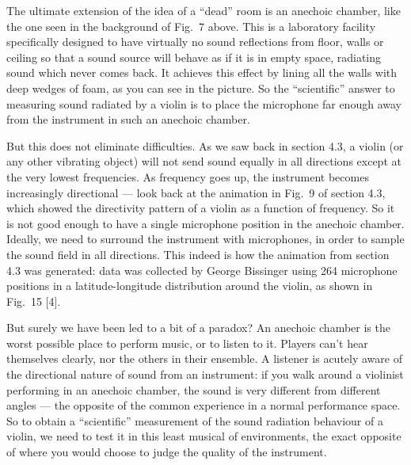   The ultimate extension of the idea of a “dead” room is an anechoic chamber, 
  like the one seen in the background of Fig.\ 7 above. This is a laboratory 
  facility specifically designed to have virtually no sound reflections from 
  floor, walls or ceiling so that a sound source will behave as if it is in 
  empty space, radiating sound which never comes back. It achieves this effect 
  by lining all the walls with deep wedges of foam, as you can see in the 
  picture. So the “scientific” answer to measuring sound radiated by a violin 
  is to place the microphone far enough away from the instrument in such an 
  anechoic chamber. 

  But this does not eliminate difficulties. As we saw back in section 4.3, a 
  violin (or any other vibrating object) will not send sound equally in all 
  directions except at the very lowest frequencies. As frequency goes up, the 
  instrument becomes increasingly directional — look back at the animation in 
  Fig.\ 9 of section 4.3, which showed the directivity pattern of a violin as a 
  function of frequency. So it is not good enough to have a single microphone 
  position in the anechoic chamber. Ideally, we need to surround the instrument 
  with microphones, in order to sample the sound field in all directions. This 
  indeed is how the animation from section 4.3 was generated: data was 
  collected by George Bissinger using 264 microphone positions in a 
  latitude-longitude distribution around the violin, as shown in Fig.\ 15 [4]. 


  But surely we have been led to a bit of a paradox? An anechoic chamber is the 
  worst possible place to perform music, or to listen to it. Players can’t hear 
  themselves clearly, nor the others in their ensemble. A listener is acutely 
  aware of the directional nature of sound from an instrument: if you walk 
  around a violinist performing in an anechoic chamber, the sound is very 
  different from different angles — the opposite of the common experience in a 
  normal performance space. So to obtain a “scientific” measurement of the 
  sound radiation behaviour of a violin, we need to test it in this least 
  musical of environments, the exact opposite of where you would choose to 
  judge the quality of the instrument. 

